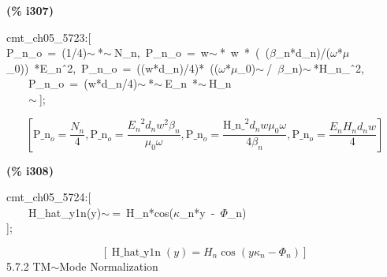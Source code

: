 \documentclass[fleqn]{article}
\begin{document}
\noindent
\begin{minipage}[t]{4.000000em}\color{red}\bfseries
(\% i307)	
\end{minipage}
\begin{minipage}[t]{\textwidth}\color{blue}
cmt\_ch05\_5723:[\\
P\_n\_o\ =\ (1/4)\ensuremath{\sim\ }*\ensuremath{\sim\ }N\_n,\ P\_n\_o\ =\ w\ensuremath{\sim\ }*\ w\ *\ (\ (\ensuremath{\beta}\_n*d\_n)/(\ensuremath{\omega}*\ensuremath{\mu}\_0))\ *E\_n\^\ 2,\ P\_n\_o\ =\ ((w*d\_n)/4)*\ ((\ensuremath{\omega}*\ensuremath{\mu}\_0)\ensuremath{\sim\ }/\ \ensuremath{\beta}\_n)\ensuremath{\sim\ }*H\_n\_\^\ 2,\\
\ \ \ \ P\_n\_o\ =\ (w*d\_n/4)\ensuremath{\sim\ }*\ensuremath{\sim\ }E\_n\ *\ensuremath{\sim\ }H\_n\\
\ \ \ \ \ensuremath{\sim\ }];
\end{minipage}
\[\displaystyle \tag{\% o307} 
\left[ {{\ensuremath{\mathrm{P\_ n}}}_o}=\frac{{N_n}}{4}\operatorname{,}{{\ensuremath{\mathrm{P\_ n}}}_o}=\frac{{{{E_n}}^{2}} {d_n} {{w}^{2}} {{\beta }_n}}{{{\mu }_0} \omega }\operatorname{,}{{\ensuremath{\mathrm{P\_ n}}}_o}=\frac{{{\ensuremath{\mathrm{H\_ n\_ }}}^{2}} {d_n} w {{\mu }_0} \omega }{4 {{\beta }_n}}\operatorname{,}{{\ensuremath{\mathrm{P\_ n}}}_o}=\frac{{E_n} {H_n} {d_n} w}{4}\right] \mbox{}
\]


\noindent
\begin{minipage}[t]{4.000000em}\color{red}\bfseries
(\% i308)	
\end{minipage}
\begin{minipage}[t]{\textwidth}\color{blue}
cmt\_ch05\_5724:[\\
\ \ \ \ H\_hat\_y1n(y)\ensuremath{\sim\ }=\ H\_n*cos(\ensuremath{\kappa}\_n*y\ -\ \ensuremath{\Phi}\_n)\\
];
\end{minipage}
\[\displaystyle \tag{\% o308} 
\left[ \operatorname{H\_ hat\_ y1n}(y)={H_n} \cos{\left( y {{\kappa }_n}-{{\Phi }_n}\right) }\right] \mbox{}
\]
5.7.2   TM\ensuremath{\sim }Mode Normalization
\end{document}
